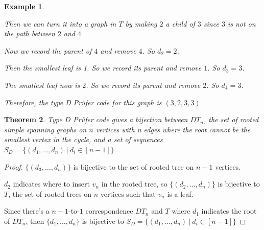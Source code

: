 \documentclass[11pt]{amsart}
\newtheorem{thm}{Theorem}[section]
\newtheorem{exa}[thm]{Example}%
\begin{document}
\begin{exa}
\begin{center}
\begin{tikzpicture}[x=0.75pt,y=0.75pt,yscale=-1,xscale=1]
\end{tikzpicture}
\end{center}

Then we can turn it into a graph in $T$ by making $2$ a child of $3$ since $3$ is not on the path between $2$ and $4$

\begin{center}
    


\end{center}

Now we record the parent of $4$ and remove $4$. So $d_2=2$.

Then the smallest leaf is 1. So we record its parent and remove $1$. So $d_3=3$.

The smallest leaf now is $2$. So we record its parent and remove $2$. So $d_4=3$.

Therefore, the type D Pr\"{u}fer code for this graph is $(3,2,3,3)$

\end{exa}

\begin{thm}\label{thm G}
    Type $D$ Pr\"{u}fer code gives a bijection between $DT_n$, the set of  rooted simple spanning graphs on $n$ vertices with n edges where the root cannot be the smallest vertex in the cycle, and a set of sequences $S_D=\{(d_1,\dots,d_n) \ | \ d_i \in [n-1]\}$
\end{thm}

\begin{proof}
    $\{(d_3,\dots,d_n)\}$ is bijective to the set of rooted tree on $n-1$ vertices. 

    $d_2$ indicates where to insert $v_n$ in the rooted tree, so $\{(d_2,\dots,d_n)\}$ is bijective to $T$, the set of rooted trees on $n$ vertices such that $v_n$ is a leaf.

    Since there's a $n-1$-to-$1$ correspondence $DT_n$ and $T$ where $d_1$ indicates the root of $DT_n$, then $\{d_1,\dots,d_n\}$ is bijective to $S_D=\{(d_1,\dots,d_n) \ | \ d_i \in [n-1]\}$
\end{proof}
\end{document}
